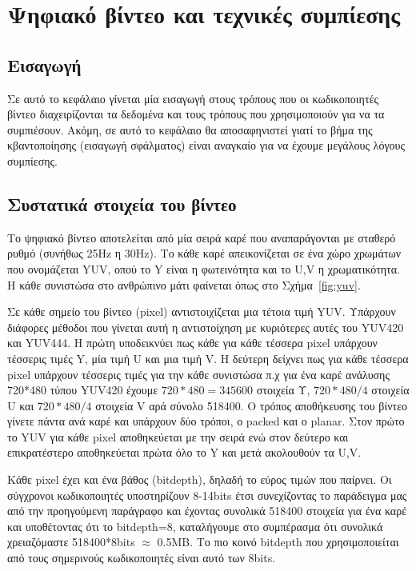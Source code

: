 ﻿\chapter{Ψηφιακό βίντεο και τεχνικές συμπίεσης}
\label{chapter:chap2}


\section{Εισαγωγή}
\label{section:sect21}
\indent Σε αυτό το κεφάλαιο γίνεται μία εισαγωγή στους τρόπους που οι κωδικοποιητές βίντεο διαχειρίζονται τα δεδομένα και τους τρόπους που χρησιμοποιούν για να τα συμπιέσουν. Ακόμη, σε αυτό το κεφάλαιο θα αποσαφηνιστεί γιατί το βήμα της κβαντοποίησης (εισαγωγή σφάλματος) είναι αναγκαίο για να έχουμε μεγάλους λόγους συμπίεσης.

\section{Συστατικά στοιχεία του βίντεο}
\label{section:sect22}

\indent Το ψηφιακό βίντεο αποτελείται από μία σειρά καρέ που αναπαράγονται με σταθερό ρυθμό (συνήθως 25Hz η 30Hz). Το κάθε καρέ απεικονίζεται σε ένα χώρο χρωμάτων που ονομάζεται YUV, οπού το Y είναι η φωτεινότητα και το U,V η χρωματικότητα. Η κάθε συνιστώσα στο ανθρώπινο μάτι φαίνεται όπως στο Σχήμα~\ref{fig:yuv}.

\indent Σε κάθε σημείο του βίντεο (pixel) αντιστοιχίζεται μια τέτοια τιμή YUV. Υπάρχουν διάφορες μέθοδοι που γίνεται αυτή η αντιστοίχηση με κυριότερες αυτές του YUV420 και YUV444. Η πρώτη υποδεικνύει πως κάθε για κάθε τέσσερα pixel υπάρχουν τέσσερις τιμές Y, μία τιμή U και μια τιμή V. Η δεύτερη δείχνει πως για κάθε τέσσερα pixel υπάρχουν τέσσερις τιμές για την κάθε συνιστώσα π.χ για ένα καρέ ανάλυσης 720*480 τύπου YUV420 έχουμε \(720*480=345600\) στοιχεία Υ, \(720*480/4\) στοιχεία U και \(720*480/4 \) στοιχεία V αρά σύνολο 518400. Ο τρόπος αποθήκευσης του βίντεο γίνετε πάντα ανά καρέ και υπάρχουν δύο τρόποι, ο packed και ο planar. Στον πρώτο το YUV για κάθε pixel αποθηκεύεται με την σειρά ενώ στον δεύτερο και επικρατέστερο αποθηκεύεται πρώτα όλο το Y και μετά ακολουθούν τα U,V.

\indent Κάθε pixel έχει και ένα βάθος (bitdepth), δηλαδή το εύρος τιμών που παίρνει. Οι σύγχρονοι κωδικοποιητές υποστηρίζουν 8-14bits έτσι συνεχίζοντας το παράδειγμα μας από την προηγούμενη παράγραφο και έχοντας συνολικά 518400 στοιχεία για ένα καρέ και υποθέτοντας ότι το bitdepth=8, καταλήγουμε στο συμπέρασμα ότι συνολικά χρειαζόμαστε 518400*8bits $\approx$ 0.5MB. Το πιο κοινό bitdepth που χρησιμοποιείται από τους σημερινούς κωδικοποιητές είναι αυτό των 8bits.

